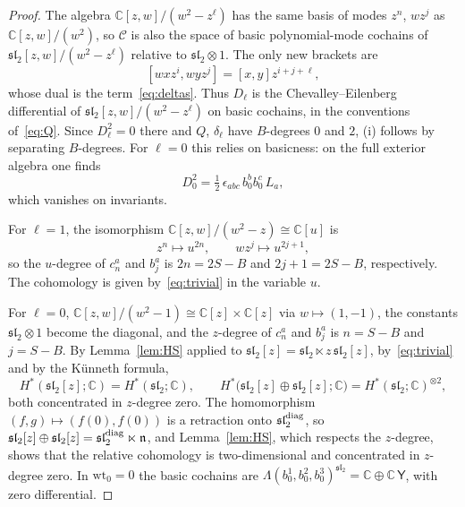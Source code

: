 \documentclass[11pt]{amsart}
\numberwithin{equation}{section}
\theoremstyle{definition}
\theoremstyle{remark}
\newcommand{\C}{\mathbb{C}}
\newcommand{\sltwo}{\mathfrak{sl}_2}
\newcommand{\cC}{\mathcal{C}}
\newcommand{\Yc}{\mathsf{Y}}
\newcommand{\wt}{\mathrm{wt}}
\begin{document}
\begin{proof}
The algebra $\C[z,w]/(w^2-z^\ell)$ has the same basis of modes $z^n$, $wz^j$ as $\C[z,w]/(w^2)$, so $\cC$ is also the space of basic polynomial-mode cochains of $\sltwo[z,w]/(w^2-z^\ell)$ relative to $\sltwo\otimes1$. The only new brackets are
\begin{equation}\label{eq:new-brackets}
[wxz^i,wyz^j]=[x,y]z^{i+j+\ell},
\end{equation}
whose dual is the term~\eqref{eq:deltas}. Thus $D_\ell$ is the Chevalley--Eilenberg differential of $\sltwo[z,w]/(w^2-z^\ell)$ on basic cochains, in the conventions of~\eqref{eq:Q}. Since $D_\ell^2=0$ there and $Q$, $\delta_\ell$ have $B$-degrees $0$ and $2$, (i) follows by separating $B$-degrees. For $\ell=0$ this relies on basicness: on the full exterior algebra one finds
\begin{equation}\label{eq:D0-squared}
D_0^2=\tfrac12\,\epsilon_{abc}\,b_0^bb_0^c\,L_a,
\end{equation}
which vanishes on invariants.

For $\ell=1$, the isomorphism $\C[z,w]/(w^2-z)\cong\C[u]$ is
\begin{equation}\label{eq:parabola-iso}
z^n\longmapsto u^{2n},\qquad wz^j\longmapsto u^{2j+1},
\end{equation}
so the $u$-degree of $c_n^a$ and $b_j^a$ is $2n=2S-B$ and $2j+1=2S-B$, respectively. The cohomology is given by~\eqref{eq:trivial} in the variable $u$.

For $\ell=0$, $\C[z,w]/(w^2-1)\cong\C[z]\times\C[z]$ via $w\mapsto(1,-1)$, the constants $\sltwo\otimes1$ become the diagonal, and the $z$-degree of $c_n^a$ and $b_j^a$ is $n=S-B$ and $j=S-B$. By Lemma~\ref{lem:HS} applied to $\sltwo[z]=\sltwo\ltimes z\,\sltwo[z]$, by~\eqref{eq:trivial} and by the K\"unneth formula,
\begin{equation}\label{eq:pair-of-lines-coh}
H^*(\sltwo[z];\C)=H^*(\sltwo;\C),\qquad H^*\bigl(\sltwo[z]\oplus\sltwo[z];\C\bigr)=H^*(\sltwo;\C)^{\otimes2},
\end{equation}
both concentrated in $z$-degree zero. The homomorphism $(f,g)\mapsto(f(0),f(0))$ is a retraction onto $\sltwo^{\rm diag}$, so $\sltwo[z]\oplus\sltwo[z]=\sltwo^{\rm diag}\ltimes\mathfrak n$, and Lemma~\ref{lem:HS}, which respects the $z$-degree, shows that the relative cohomology is two-dimensional and concentrated in $z$-degree zero. In $\wt_0=0$ the basic cochains are $\Lambda(b_0^1,b_0^2,b_0^3)^{\sltwo}=\C\oplus\C\,\Yc$, with zero differential.
\end{proof}
\end{document}
